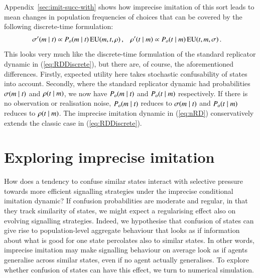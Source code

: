 \documentclass[11pt,english]{article}
\numberwithin{equation}{section}
\begin{document}
Appendix~\ref{sec:imit-succ-with} shows how imprecise imitation of this sort leads to mean changes in population
frequencies of choices that can be covered by the following discrete-time formulation:
\begin{align}
  \label{eq:nRD}
  \sigma'(m \mid t) & \propto P_o(m \mid t) \thinspace \mathrm{EU}(m,
  t, \rho)\,, & \rho'(t \mid m) & \propto P_o(t \mid m)
  \thinspace \mathrm{EU}(t, m, \sigma)\,.
\end{align}
\noindent This looks very much like the discrete-time formulation of the standard replicator
dynamic in (\ref{eq:RDDiscrete}), but there are, of course, the aforementioned
differences. Firstly, expected utility here takes stochastic confusability of states into
account. Secondly, where the standard replicator dynamic had probabilities
$\sigma(m \mid t)$ and $\rho(t \mid m)$, we now have
$P_o(m \mid t)$ and $P_o(t \mid m)$ respectively. If there is no
observation or realisation noise, $P_o(m \mid t)$ reduces to
$\sigma(m \mid t)$ and $P_o(t \mid m)$ reduces to
$\rho(t \mid m)$. The imprecise imitation dynamic in (\ref{eq:nRD})
conservatively extends the classic case in (\ref{eq:RDDiscrete}).







\section{Exploring imprecise imitation}
\label{sec:exploring-rdd}

How does a tendency to confuse similar states interact with selective pressure towards more
efficient signalling strategies under the imprecise conditional imitation dynamic? If confusion
probabilities are moderate and regular, in that they track similarity of states, we might
expect a regularising effect also on evolving signalling strategies. Indeed, we hypothesise
that confusion of states can give rise to population-level aggregate behaviour that looks as
if information about what is good for one state percolates also to similar states. In other
words, imprecise imitation may make signalling behaviour on average look as if agents
generalise across similar states, even if no agent actually generalises. To explore whether
confusion of states can have this effect, we turn to numerical simulation.
\end{document}
